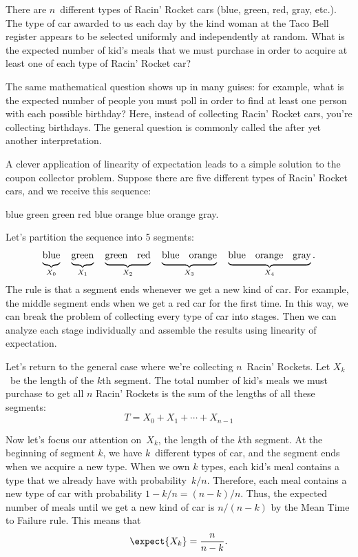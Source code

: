 There are $n$~different types of Racin' Rocket cars (blue, green, red,
gray, etc.).  The type of car awarded to us each day by the kind woman
at the Taco Bell register appears to be selected uniformly and
independently at random.  What is the expected number of kid's meals
that we must purchase in order to acquire at least one of each type of
Racin' Rocket car?

The same mathematical question shows up in many guises: for example,
what is the expected number of people you must poll in order to find
at least one person with each possible birthday?  Here, instead of
collecting Racin' Rocket cars, you're collecting birthdays.  The
general question is commonly called the  after yet another interpretation.

A clever application of linearity of expectation leads to a simple
solution to the coupon collector problem.  Suppose there are five
different types of Racin' Rocket cars, and we receive this sequence:
%
\begin{center}
blue \quad green \quad green \quad red \quad blue \quad orange \quad
blue \quad orange \quad gray.
\end{center}
%
Let's partition the sequence into 5 segments:
%
\[
\underbrace{\strut\text{blue}}_{X_0} \quad
\underbrace{\strut\text{green}}_{X_1} \quad
\underbrace{\strut\text{green} \quad \text{red}}_{X_2} \quad
\underbrace{\strut\text{blue} \quad \text{orange}}_{X_3} \quad
\underbrace{\strut\text{blue} \quad \text{orange} \quad \text{gray}}_{X_4}.
\]
%
The rule is that a segment ends whenever we get a new kind of car.
For example, the middle segment ends when we get a red car for the
first time.  In this way, we can break the problem of collecting every
type of car into stages.  Then we can analyze each stage individually
and assemble the results using linearity of expectation.

Let's return to the general case where we're collecting $n$~Racin'
Rockets.  Let $X_k$~be the length of the $k$th segment.  The total
number of kid's meals we must purchase to get all $n$ Racin' Rockets is
the sum of the lengths of all these segments:
%
\[
T = X_0 + X_1 + \cdots + X_{n-1}
\]

Now let's focus our attention on~$X_k$, the length of the $k$th
segment.  At the beginning of segment $k$, we have $k$~different types
of car, and the segment ends when we acquire a new type.  When we own
$k$ types, each kid's meal contains a type that we already have with
probability~$k / n$.  Therefore, each meal contains a new type of car
with probability $1 - k / n = (n - k) / n$.  Thus, the expected number
of meals until we get a new kind of car is $n / (n - k)$ by the Mean
Time to Failure rule.  This means that
%
\[
    \expect{X_k} = \frac{n}{n - k}.
\]

